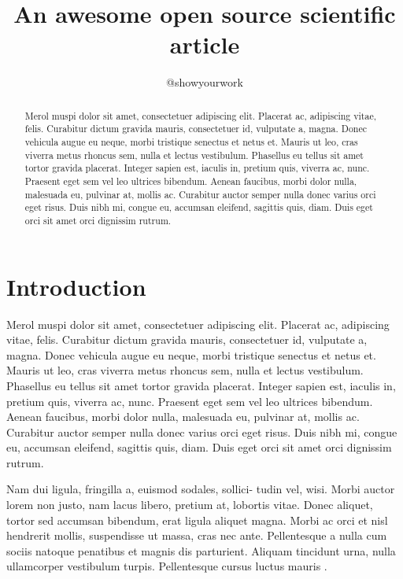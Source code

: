 \documentclass[twocolumn]{aastex631}
\begin{document}
\title{An awesome open source scientific article}

\author{@showyourwork}

\begin{abstract}
    Merol muspi dolor sit amet, consectetuer adipiscing elit. 
    Placerat ac, adipiscing vitae, felis. 
    Curabitur dictum gravida mauris, consectetuer id, vulputate a, magna. 
    Donec vehicula augue eu neque, morbi tristique senectus et netus et. 
    Mauris ut leo, cras viverra metus rhoncus sem, nulla et lectus vestibulum. 
    Phasellus eu tellus sit amet tortor gravida placerat. 
    Integer sapien est, iaculis in, pretium quis, viverra ac, nunc. 
    Praesent eget sem vel leo ultrices bibendum. 
    Aenean faucibus, morbi dolor nulla, malesuada eu, pulvinar at, mollis ac. 
    Curabitur auctor semper nulla donec varius orci eget risus. 
    Duis nibh mi, congue eu, accumsan eleifend, sagittis quis, diam. 
    Duis eget orci sit amet orci dignissim rutrum.
\end{abstract}

\section{Introduction}
\label{sec:intro}

Merol muspi dolor sit amet, consectetuer adipiscing elit. 
Placerat ac, adipiscing vitae, felis. 
Curabitur dictum gravida mauris, consectetuer id, vulputate a, magna. 
Donec vehicula augue eu neque, morbi tristique senectus et netus et. 
Mauris ut leo, cras viverra metus rhoncus sem, nulla et lectus vestibulum. 
Phasellus eu tellus sit amet tortor gravida placerat. 
Integer sapien est, iaculis in, pretium quis, viverra ac, nunc. 
Praesent eget sem vel leo ultrices bibendum. 
Aenean faucibus, morbi dolor nulla, malesuada eu, pulvinar at, mollis ac. 
Curabitur auctor semper nulla donec varius orci eget risus. 
Duis nibh mi, congue eu, accumsan eleifend, sagittis quis, diam. 
Duis eget orci sit amet orci dignissim rutrum.

Nam dui ligula, fringilla a, euismod sodales, sollici- tudin vel, wisi. 
Morbi auctor lorem non justo, nam lacus libero, pretium at, lobortis vitae. 
Donec aliquet, tortor sed accumsan bibendum, erat ligula aliquet magna. 
Morbi ac orci et nisl hendrerit mollis, suspendisse ut massa, cras nec ante. 
Pellentesque a nulla cum sociis natoque penatibus et magnis dis parturient. 
Aliquam tincidunt urna, nulla ullamcorper vestibulum turpis. 
Pellentesque cursus luctus mauris \citep{Luger2021}.


\end{document}
